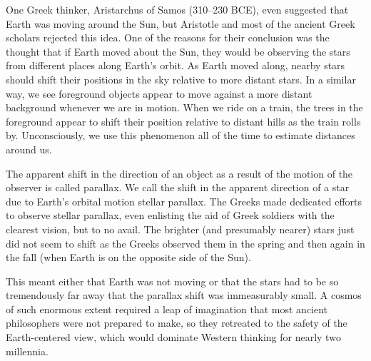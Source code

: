 \documentclass[main.tex]{subfiles}
\begin{document}
\vspace{1em}

One Greek thinker, Aristarchus of Samos (310--230 BCE), even suggested that Earth was moving around the Sun, but Aristotle and most of the ancient Greek scholars rejected this idea. One of the reasons for their conclusion was the thought that if Earth moved about the Sun, they would be observing the stars from different places along Earth's orbit. As Earth moved along, nearby stars should shift their positions in the sky relative to more distant stars. In a similar way, we see foreground objects appear to move against a more distant background whenever we are in motion. When we ride on a train, the trees in the foreground appear to shift their position relative to distant hills as the train rolls by. Unconsciously, we use this phenomenon all of the time to estimate distances around us.

\vspace{1em}

The apparent shift in the direction of an object as a result of the motion of the observer is called \gls{parallax}. We call the shift in the apparent direction of a star due to Earth's orbital motion stellar parallax. The Greeks made dedicated efforts to observe stellar parallax, even enlisting the aid of Greek soldiers with the clearest vision, but to no avail. The brighter (and presumably nearer) stars just did not seem to shift as the Greeks observed them in the spring and then again in the fall (when Earth is on the opposite side of the Sun).

\vspace{1em}

This meant either that Earth was not moving or that the stars had to be so tremendously far away that the parallax shift was immeasurably small. A cosmos of such enormous extent required a leap of imagination that most ancient philosophers were not prepared to make, so they retreated to the safety of the Earth-centered view, which would dominate Western thinking for nearly two millennia.
\end{document}
